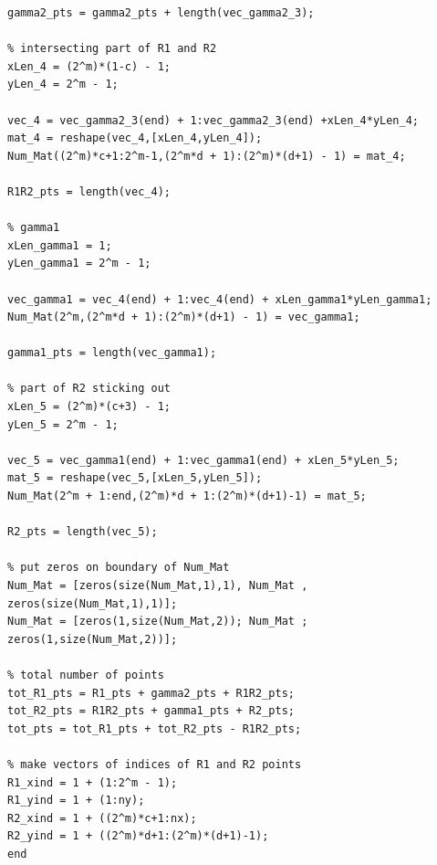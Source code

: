 \documentclass[12pt]{article}
\begin{document}
\begin{lstlisting}[caption=Enumeration for b between 0 and 2]
gamma2_pts = gamma2_pts + length(vec_gamma2_3);

% intersecting part of R1 and R2
xLen_4 = (2^m)*(1-c) - 1;
yLen_4 = 2^m - 1;

vec_4 = vec_gamma2_3(end) + 1:vec_gamma2_3(end) +xLen_4*yLen_4;
mat_4 = reshape(vec_4,[xLen_4,yLen_4]);
Num_Mat((2^m)*c+1:2^m-1,(2^m*d + 1):(2^m)*(d+1) - 1) = mat_4;

R1R2_pts = length(vec_4);

% gamma1
xLen_gamma1 = 1;
yLen_gamma1 = 2^m - 1;

vec_gamma1 = vec_4(end) + 1:vec_4(end) + xLen_gamma1*yLen_gamma1;
Num_Mat(2^m,(2^m*d + 1):(2^m)*(d+1) - 1) = vec_gamma1;

gamma1_pts = length(vec_gamma1);

% part of R2 sticking out
xLen_5 = (2^m)*(c+3) - 1;
yLen_5 = 2^m - 1;

vec_5 = vec_gamma1(end) + 1:vec_gamma1(end) + xLen_5*yLen_5;
mat_5 = reshape(vec_5,[xLen_5,yLen_5]);
Num_Mat(2^m + 1:end,(2^m)*d + 1:(2^m)*(d+1)-1) = mat_5;

R2_pts = length(vec_5);

% put zeros on boundary of Num_Mat
Num_Mat = [zeros(size(Num_Mat,1),1), Num_Mat , zeros(size(Num_Mat,1),1)];
Num_Mat = [zeros(1,size(Num_Mat,2)); Num_Mat ; zeros(1,size(Num_Mat,2))];

% total number of points
tot_R1_pts = R1_pts + gamma2_pts + R1R2_pts;
tot_R2_pts = R1R2_pts + gamma1_pts + R2_pts;
tot_pts = tot_R1_pts + tot_R2_pts - R1R2_pts;

% make vectors of indices of R1 and R2 points
R1_xind = 1 + (1:2^m - 1);
R1_yind = 1 + (1:ny);
R2_xind = 1 + ((2^m)*c+1:nx);
R2_yind = 1 + ((2^m)*d+1:(2^m)*(d+1)-1);
end
\end{lstlisting}
\end{document}
